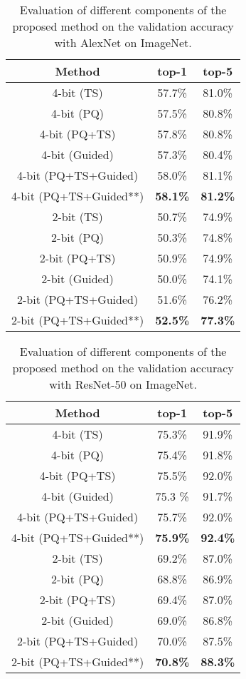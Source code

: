 \begin{table}[!tbp]
	\centering
	\scalebox{1.0}
	{
		\begin{tabular}{c c c}
			\hline
			Method &top-1  &top-5 \\\hline
			 4-bit (TS) &57.7\% &81.0\%\\
			 4-bit (PQ)  &57.5\%  &80.8\%\\
			 4-bit (PQ+TS) &57.8\% &80.8\% \\
			 4-bit (Guided) &57.3\% &80.4\%\\
			 4-bit (PQ+TS+Guided)  &58.0\% &81.1\%\\
			 4-bit (PQ+TS+Guided**)  &\bf{58.1}\% &\bf{81.2}\% \\\hline
			 2-bit (TS)  &50.7\% &74.9\% \\
			 2-bit (PQ)  &50.3\% &74.8\% \\
			 2-bit (PQ+TS)  &50.9\% &74.9\% \\
			 2-bit (Guided) &50.0\%  &74.1\% \\
			 2-bit (PQ+TS+Guided)  &51.6\% &76.2\% \\
			 2-bit (PQ+TS+Guided**) &\bf{52.5}\% &\bf{77.3}\% \\\hline

		\end{tabular}}
		\caption{Evaluation of different components of the proposed method on the validation accuracy with AlexNet on ImageNet.}
		\label{tab:AlexNet_ablation}
	\end{table}

\begin{table}[!tbp]
	\centering
	\scalebox{1.0}
	{
		\begin{tabular}{c c c}
			\hline
			Method &top-1  &top-5 \\\hline
			4-bit (TS) &75.3\% &91.9\%\\
			4-bit (PQ)  &75.4\%  &91.8\%\\
			4-bit (PQ+TS) &75.5\% &92.0\% \\
			4-bit (Guided) &75.3 \% &91.7\% \\
			4-bit (PQ+TS+Guided)  &75.7\% &92.0\%\\
			4-bit (PQ+TS+Guided**)  &\bf{75.9}\% &\bf{92.4}\% \\\hline
			2-bit (TS)  &69.2\% &87.0\% \\
			2-bit (PQ)  &68.8\% &86.9\% \\
			2-bit (PQ+TS)  &69.4\% &87.0\% \\
		    2-bit (Guided) &69.0\%  & 86.8\%\\
			2-bit (PQ+TS+Guided)  &70.0\% &87.5\% \\
			2-bit (PQ+TS+Guided**) &\bf{70.8}\% &\bf{88.3}\% \\\hline

		\end{tabular}}
			\caption{Evaluation of different components of the proposed method on the validation accuracy with ResNet-50 on ImageNet.}
			\label{tab:ResNet-50_ablation}
\end{table}


